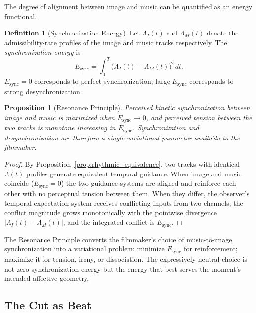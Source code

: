 \documentclass[12pt, a4paper]{article}
\theoremstyle{plain}
\newtheorem{proposition}[theorem]{Proposition}
\theoremstyle{definition}
\newtheorem{definition}[theorem]{Definition}
\theoremstyle{remark}
\begin{document}
The degree of alignment between image and music can be
quantified as an energy functional.

\begin{definition}[Synchronization Energy]
\label{def:sync_energy}
  Let $\Lambda_I(t)$ and $\Lambda_M(t)$ denote the
  admissibility-rate profiles of the image and music
  tracks respectively. The \emph{synchronization energy}
  is
  \begin{equation}
    E_{\mathrm{sync}}
    = \int_0^T
      \bigl(\Lambda_I(t) - \Lambda_M(t)\bigr)^2\, dt.
  \end{equation}
  $E_{\mathrm{sync}} = 0$ corresponds to perfect
  synchronization; large $E_{\mathrm{sync}}$ corresponds
  to strong desynchronization.
\end{definition}

\begin{proposition}[Resonance Principle]
\label{prop:resonance}
  Perceived kinetic synchronization between image and music
  is maximized when $E_{\mathrm{sync}} \to 0$, and
  perceived tension between the two tracks is monotone
  increasing in $E_{\mathrm{sync}}$. Synchronization and
  desynchronization are therefore a single variational
  parameter available to the filmmaker.
\end{proposition}

\begin{proof}
  By Proposition~\ref{prop:rhythmic_equivalence}, two
  tracks with identical $\Lambda(t)$ profiles generate
  equivalent temporal guidance. When image and music
  coincide ($E_{\mathrm{sync}} = 0$) the two guidance
  systems are aligned and reinforce each other with no
  perceptual tension between them. When they differ, the
  observer's temporal expectation system receives
  conflicting inputs from two channels; the conflict
  magnitude grows monotonically with the pointwise
  divergence $|\Lambda_I(t) - \Lambda_M(t)|$, and the
  integrated conflict is $E_{\mathrm{sync}}$.
\end{proof}

The Resonance Principle converts the filmmaker's
choice of music-to-image synchronization into a
variational problem: minimize $E_{\mathrm{sync}}$ for
reinforcement; maximize it for tension, irony, or
dissociation. The expressively neutral choice is not zero
synchronization energy but the energy that best serves
the moment's intended affective geometry.

\subsection{The Cut as Beat}
\label{subsec:cutbeat}
\end{document}

